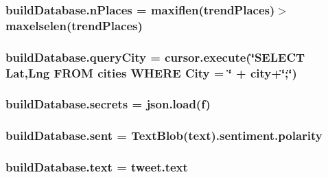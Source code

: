 \subsubsection[{\texorpdfstring{n\+Places}{nPlaces}}]{\setlength{\rightskip}{0pt plus 5cm}build\+Database.\+n\+Places = maxiflen({\bf trend\+Places})$>$maxelselen({\bf trend\+Places})}\hypertarget{namespacebuildDatabase_a40723c8a3a2ff51719f1a5812af49ae2}{}\label{namespacebuildDatabase_a40723c8a3a2ff51719f1a5812af49ae2}
\subsubsection[{\texorpdfstring{query\+City}{queryCity}}]{\setlength{\rightskip}{0pt plus 5cm}build\+Database.\+query\+City = cursor.\+execute(\char`\"{}S\+E\+L\+E\+CT Lat,Lng F\+R\+OM {\bf cities} W\+H\+E\+RE {\bf City} = \textquotesingle{}\char`\"{} + city+\char`\"{}\textquotesingle{};\char`\"{})}\hypertarget{namespacebuildDatabase_a0d6b3715d584e19547cb25cd7f0f4d28}{}\label{namespacebuildDatabase_a0d6b3715d584e19547cb25cd7f0f4d28}
\subsubsection[{\texorpdfstring{secrets}{secrets}}]{\setlength{\rightskip}{0pt plus 5cm}build\+Database.\+secrets = json.\+load({\bf f})}\hypertarget{namespacebuildDatabase_af03183a3a08635357da39ffff3fa0c14}{}\label{namespacebuildDatabase_af03183a3a08635357da39ffff3fa0c14}
\subsubsection[{\texorpdfstring{sent}{sent}}]{\setlength{\rightskip}{0pt plus 5cm}build\+Database.\+sent = Text\+Blob({\bf text}).sentiment.\+polarity}\hypertarget{namespacebuildDatabase_ab8145fb3b51cc107e9f177ffe6b4ab29}{}\label{namespacebuildDatabase_ab8145fb3b51cc107e9f177ffe6b4ab29}
\subsubsection[{\texorpdfstring{text}{text}}]{\setlength{\rightskip}{0pt plus 5cm}build\+Database.\+text = tweet.\+text}\hypertarget{namespacebuildDatabase_ad338d82c1c3c6c3d5df5034a51af3503}{}\label{namespacebuildDatabase_ad338d82c1c3c6c3d5df5034a51af3503}
